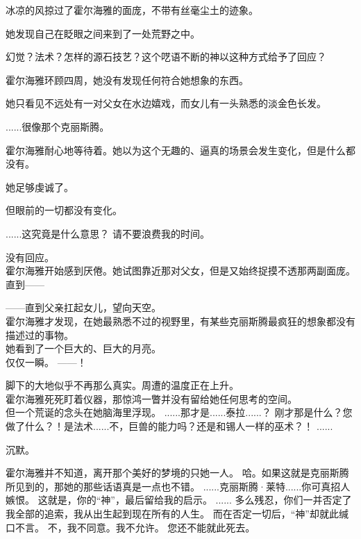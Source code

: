 \documentclass[openany]{book}
\begin{document}
冰凉的风掠过了霍尔海雅的面庞，不带有丝毫尘土的迹象。\par
她发现自己在眨眼之间来到了一处荒野之中。\par
幻觉？法术？怎样的源石技艺？这个呓语不断的神以这种方式给予了回应？\par
霍尔海雅环顾四周，她没有发现任何符合她想象的东西。\par
她只看见不远处有一对父女在水边嬉戏，而女儿有一头熟悉的淡金色长发。\par
......很像那个克丽斯腾。\par
霍尔海雅耐心地等待着。她以为这个无趣的、逼真的场景会发生变化，但是什么都没有。\par
她足够虔诚了。\par
但眼前的一切都没有变化。

\begin{dialogue}
     ......这究竟是什么意思？
     请不要浪费我的时间。\par
    没有回应。\\
    霍尔海雅开始感到厌倦。她试图靠近那对父女，但是又始终捉摸不透那两副面庞。\\
    直到——\par
    ——直到父亲扛起女儿，望向天空。\\
    霍尔海雅才发现，在她最熟悉不过的视野里，有某些克丽斯腾最疯狂的想象都没有描述过的事物。\\
    她看到了一个巨大的、巨大的月亮。\\
    仅仅一瞬。
     ——！\par
    脚下的大地似乎不再那么真实。周遭的温度正在上升。\\
    霍尔海雅死死盯着仪器，那惊鸿一瞥并没有留给她任何思考的空间。\\
    但一个荒诞的念头在她脑海里浮现。
     ......那才是......泰拉......？
     刚才那是什么？您做了什么？！是法术......不，巨兽的能力吗？还是和锡人一样的巫术？！
     ......\par
    沉默。\par
    霍尔海雅并不知道，离开那个美好的梦境的只她一人。
     哈。如果这就是克丽斯腾所见到的，那她的那些话语真是一点也不错。
     ......克丽斯腾·莱特......你可真招人嫉恨。
     这就是，你的“神”，最后留给我的启示。
     ......
     多么残忍，你们一并否定了我全部的追索，我从出生起到现在所有的人生。
     而在否定一切后，“神”却就此缄口不言。
     不，我不同意。我不允许。
     您还不能就此死去。
\end{dialogue}
\end{document}
